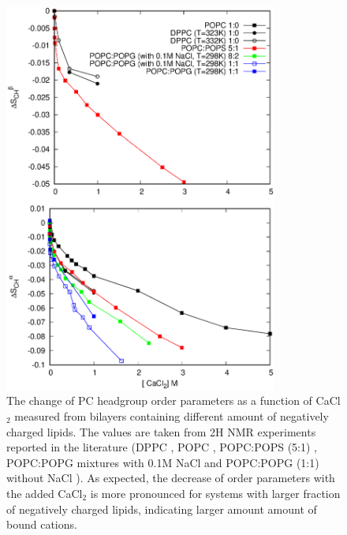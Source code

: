 \documentclass[aps,prl,superscriptaddress,twocolumn]{revtex4}
\begin{document}
\begin{figure}[]
  \centering
  \includegraphics[width=9.0cm]{../Figs/CHANGESwithCaCl.eps}
  \caption{\label{OrderParameterCHANGESWithCaClBELOW1M}
    The change of PC headgroup order parameters as a function of CaCl$_2$
    measured from bilayers containing different amount of negatively charged lipids.
    The values are taken from 2H NMR experiments reported in the
    literature (DPPC \cite{akutsu81}, POPC \cite{altenbach84}, POPC:POPS (5:1) \cite{roux90},
    POPC:POPG  mixtures with 0.1M NaCl \cite{macdonald87}
    and POPC:POPG (1:1) without NaCl \cite{borle85}).
    As expected, the decrease of order parameters with the added CaCl$_2$
    is more pronounced for systems with larger fraction of
    negatively charged lipids, indicating larger amount amount
    of bound cations.
  }
\end{figure}
\end{document}
